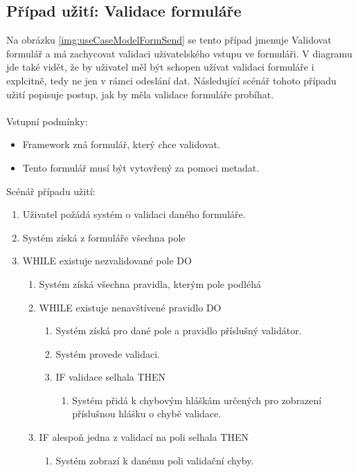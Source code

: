 \subsection{Případ užití: Validace formuláře}
Na obrázku \ref{img:useCaseModelFormSend} se tento případ jmenuje Validovat formulář a má zachycovat validaci uživatelského vstupu ve formuláři. V diagramu jde také vidět, že by uživatel měl být schopen užívat validaci formuláře i explcitně, tedy ne jen v rámci odeslání dat. Následující scénář tohoto případu užití popisuje postup, jak by měla validace formuláře probíhat.\\\\
Vstupní podmínky:
\begin{itemize}
\item Framework zná formulář, který chce validovat. 
\item Tento formulář musí být vytovřený za pomoci metadat.
\end{itemize}
Scénář případu užití:
\begin{enumerate}
\item Uživatel požádá systém o validaci daného formuláře.
\item Systém získá z formuláře všechna pole
\item WHILE existuje nezvalidované pole DO
\begin{enumerate}
\item Systém získá všechna pravidla, kterým pole podléhá
\item WHILE existuje nenavštívené pravidlo DO
\begin{enumerate}
\item Systém získá pro dané pole a pravidlo příslušný validátor.
\item Systém provede validaci.
\item IF validace selhala THEN
\begin{enumerate}
\item Systém přidá k chybovým hláškám určených pro zobrazení příslušnou hlášku o chybě validace.
\end{enumerate}
\end{enumerate}
\item IF alespoň jedna z validací na poli selhala THEN
\begin{enumerate}
\item Systém zobrazí k danému poli validační chyby.
\end{enumerate}
\end{enumerate} 
\end{enumerate}

